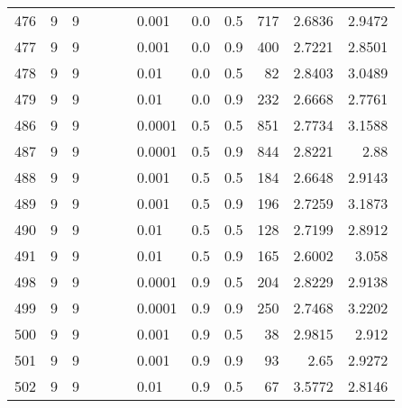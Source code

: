 \begin{longtable}{lrrrrrlrrrrr}
  476 &       9 & 9 &   &   &   &                       0.001 &      0.0 &    0.5 &     717 &                 2.6836 &                 2.9472 \\
  477 &       9 & 9 &   &   &   &                       0.001 &      0.0 &    0.9 &     400 &                 2.7221 &                 2.8501 \\
  478 &       9 & 9 &   &   &   &                        0.01 &      0.0 &    0.5 &      82 &                 2.8403 &                 3.0489 \\
  479 &       9 & 9 &   &   &   &                        0.01 &      0.0 &    0.9 &     232 &                 2.6668 &                 2.7761 \\
  486 &       9 & 9 &   &   &   &                      0.0001 &      0.5 &    0.5 &     851 &                 2.7734 &                 3.1588 \\
  487 &       9 & 9 &   &   &   &                      0.0001 &      0.5 &    0.9 &     844 &                 2.8221 &                   2.88 \\
  488 &       9 & 9 &   &   &   &                       0.001 &      0.5 &    0.5 &     184 &                 2.6648 &                 2.9143 \\
  489 &       9 & 9 &   &   &   &                       0.001 &      0.5 &    0.9 &     196 &                 2.7259 &                 3.1873 \\
  490 &       9 & 9 &   &   &   &                        0.01 &      0.5 &    0.5 &     128 &                 2.7199 &                 2.8912 \\
  491 &       9 & 9 &   &   &   &                        0.01 &      0.5 &    0.9 &     165 &                 2.6002 &                  3.058 \\
  498 &       9 & 9 &   &   &   &                      0.0001 &      0.9 &    0.5 &     204 &                 2.8229 &                 2.9138 \\
  499 &       9 & 9 &   &   &   &                      0.0001 &      0.9 &    0.9 &     250 &                 2.7468 &                 3.2202 \\
  500 &       9 & 9 &   &   &   &                       0.001 &      0.9 &    0.5 &      38 &                 2.9815 &                  2.912 \\
  501 &       9 & 9 &   &   &   &                       0.001 &      0.9 &    0.9 &      93 &                   2.65 &                 2.9272 \\
  502 &       9 & 9 &   &   &   &                        0.01 &      0.9 &    0.5 &      67 &                 3.5772 &                 2.8146 \\

\end{longtable}

